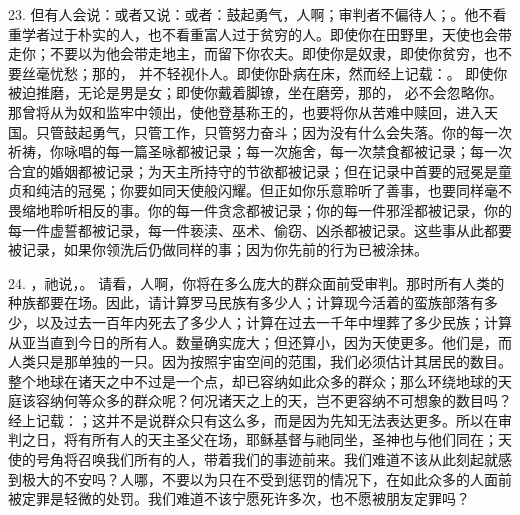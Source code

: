 23. 但有人会说：或者又说：或者：鼓起勇气，人啊；审判者不偏待人；。他不看重学者过于朴实的人，也不看重富人过于贫穷的人。即使你在田野里，天使也会带走你；不要以为他会带走地主，而留下你农夫。即使你是奴隶，即使你贫穷，也不要丝毫忧愁；那的， 并不轻视仆人。即使你卧病在床，然而经上记载：。 即使你被迫推磨，无论是男是女；即使你戴着脚镣，坐在磨旁，那的， 必不会忽略你。那曾将从为奴和监牢中领出，使他登基称王的，也要将你从苦难中赎回，进入天国。只管鼓起勇气，只管工作，只管努力奋斗；因为没有什么会失落。你的每一次祈祷，你咏唱的每一篇圣咏都被记录；每一次施舍，每一次禁食都被记录；每一次合宜的婚姻都被记录；为天主所持守的节欲都被记录；但在记录中首要的冠冕是童贞和纯洁的冠冕；你要如同天使般闪耀。但正如你乐意聆听了善事，也要同样毫不畏缩地聆听相反的事。你的每一件贪念都被记录；你的每一件邪淫都被记录，你的每一件虚誓都被记录，每一件亵渎、巫术、偷窃、凶杀都被记录。这些事从此都要被记录，如果你领洗后仍做同样的事；因为你先前的行为已被涂抹。\par

24. ，祂说，。 请看，人啊，你将在多么庞大的群众面前受审判。那时所有人类的种族都要在场。因此，请计算罗马民族有多少人；计算现今活着的蛮族部落有多少，以及过去一百年内死去了多少人；计算在过去一千年中埋葬了多少民族；计算从亚当直到今日的所有人。数量确实庞大；但还算小，因为天使更多。他们是，而人类只是那单独的一只。因为按照宇宙空间的范围，我们必须估计其居民的数目。整个地球在诸天之中不过是一个点，却已容纳如此众多的群众；那么环绕地球的天庭该容纳何等众多的群众呢？何况诸天之上的天，岂不更容纳不可想象的数目吗？经上记载：；这并不是说群众只有这么多，而是因为先知无法表达更多。所以在审判之日，将有所有人的天主圣父在场，耶稣基督与祂同坐，圣神也与他们同在；天使的号角将召唤我们所有的人，带着我们的事迹前来。我们难道不该从此刻起就感到极大的不安吗？人哪，不要以为只在不受到惩罚的情况下，在如此众多的人面前被定罪是轻微的处罚。我们难道不该宁愿死许多次，也不愿被朋友定罪吗？\par

